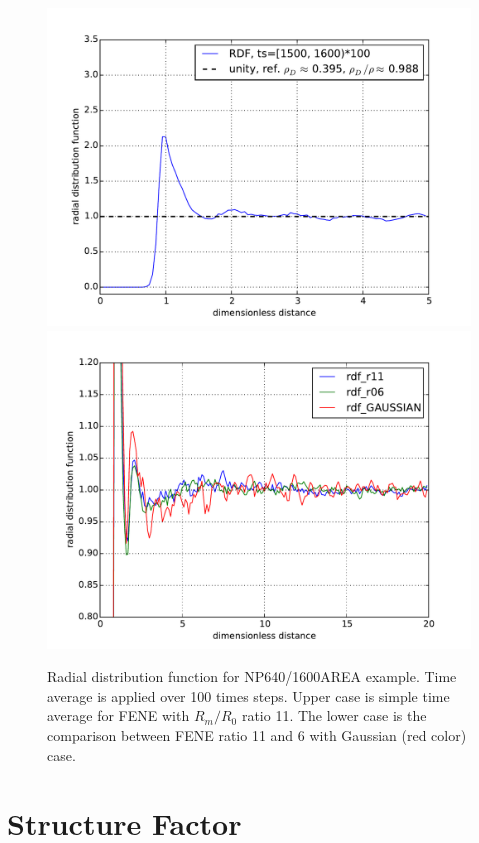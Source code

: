 \documentclass[10pt, a4paper]{article}
\begin{document}
\begin{appendices}
    \begin{figure}
      \centering
      \includegraphics[width=\textwidth]{figures/rdf_exam.pdf}\\
      \includegraphics[width=\textwidth]{figures/rdf_compare.pdf}
      \caption{Radial distribution function for NP640/1600AREA example. Time average is applied over 100 times steps. Upper case is simple time average for FENE with $R_m/R_0$ ratio 11. The lower case is the comparison between FENE ratio 11 and 6 with Gaussian (red color) case.}
      \label{fig:rdf_exam}
    \end{figure}
    
    \section{Structure Factor}

\end{appendices}
\end{document}
